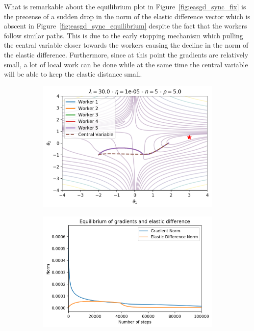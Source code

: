 What is remarkable about the equilibrium plot in Figure~\ref{fig:easgd_sync_fix} is the precense of a sudden drop in the norm of the elastic difference vector which is abscent in Figure~\ref{fig:easgd_sync_equilibrium} despite the fact that the workers follow similar paths. This is due to the early stopping mechanism which pulling the central variable closer towards the workers causing the decline in the norm of the elastic difference. Furthermore, since at this point the gradients are relatively small, a lot of local work can be done while at the same time the central variable will be able to keep the elastic distance small.

\begin{figure}[H]
  \centering
  \begin{subfigure}{.45\textwidth}
    \centering
    \includegraphics[width=\linewidth]{resources/images/easgd_sync_norm_space_fix.png}
  \end{subfigure}
  \begin{subfigure}{.45\textwidth}
    \centering
    \includegraphics[width=\linewidth]{resources/images/easgd_sync_norm_ed_fix.png}

\end{subfigure}
\end{figure}
